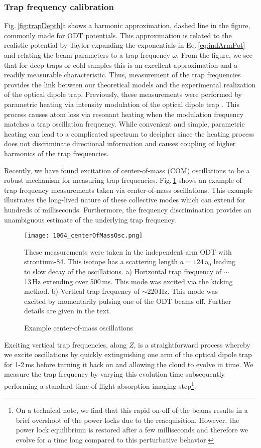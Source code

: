 \subsubsection{Trap frequency calibration} \label{sssec:1064_trap_freq}
Fig.\,\ref{fig:trapDepth}a shows a harmonic approximation, dashed line in the figure, commonly made for ODT potentials.
This approximation is related to the realistic potential by Taylor expanding the exponentials in Eq.\,\ref{eq:indArmPot} and relating the beam parameters to a trap frequency $\omega$.
From the figure, we see that for deep traps or cold samples this is an excellent approximation and a readily measurable characteristic.
Thus, measurement of the trap frequencies provides the link between our theoretical models and the experimental realization of the optical dipole trap.
Previously, these measurements were performed by parametric heating via intensity modulation of the optical dipole trap \cite{Huang2013}. 
This process causes atom loss via resonant heating when the modulation frequency matches a trap oscillation frequency. 
While convenient and simple, parametric heating can lead to a complicated spectrum to decipher since the heating process does not discriminate directional information and causes coupling of higher harmonics of the trap frequencies. 

Recently, we have found excitation of center-of-mass (COM) oscillations to be a robust mechanism for measuring trap frequencies.
Fig.\,\ref{fig:comOscillation} shows an example of trap frequency measurements taken via center-of-mass oscillations.
This example illustrates the long-lived nature of these collective modes which can extend for hundreds of milliseconds.
Furthermore, the frequency discrimination provides an unambiguous estimate of the underlying trap frequency.
	\begin{figure} 
		\centerline{
		\texttt{[image: 1064\_centerOfMassOsc.png]}}
		\caption{Example center-of-mass oscillations}{These measurements were taken in the independent arm ODT with strontium-84. This isotope has a scattering length $a=124$\,a$_0$ leading to slow decay of the oscillations. a) Horizontal trap frequency of $\sim$13\,Hz extending over 500\,ms. This mode was excited via the kicking method. b) Vertical trap frequency of $\sim$220\,Hz. This mode was excited by momentarily pulsing one of the ODT beams off. Further details are given in the text.}
		\label{fig:comOscillation}
	\end{figure}

Exciting vertical trap frequencies, along $Z$, is a straightforward process whereby we excite oscillations by quickly extinguishing one arm of the optical dipole trap for 1-2\,ms before turning it back on and allowing the cloud to evolve in time.
We measure the trap frequency by varying this evolution time subsequently performing a standard time-of-flight absorption imaging step\footnote{On a technical note, we find that this rapid on-off of the beams results in a brief overshoot of the power locks due to the reacquisition.
However, the power lock equilibrium is restored after a few milliseconds and therefore we evolve for a time long compared to this perturbative behavior.}.

